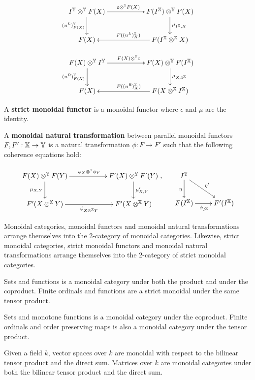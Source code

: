 \begin{definition}
$$
\xymatrix{
 I^\Y \otimes^\Y F(X) \ar[rr]^{\epsilon \otimes^\Y F(X)} \ar[d]_{(u^L)^\Y_{F(X)}}
  &&  F(I^\X) \otimes^\Y F(X) \ar[d]^{\mu_{1^\X,X}}
\\F(X)
 & & F(I^\X\otimes^\X X) \ar[ll]_{F((u^L)^\X_{X} )}
}
$$


$$
\xymatrix{
  F(X)  \otimes^\Y I^\Y \ar[rr]^{ F(X)  \otimes^\Y \epsilon} \ar[d]_{(u^R)^\Y_{F(X)}}
  && F(X) \otimes^\Y    F(I^\X)  \ar[d]^{\mu_{X,1^\X}}
\\F(X)
 & & F(X \otimes^\X I^\X ) \ar[ll]_{F((u^R)^\X_{X} )}
}
$$


A {\bf strict monoidal functor} is a monoidal functor where $\epsilon$ and $\mu$ are the identity.


A {\bf monoidal natural transformation} between parallel monoidal functors $F,F':\mathbb{X}\to \mathbb{Y}$ is a natural transformation $\phi:F\to F'$ such that the following coherence equations hold:

$$
\xymatrix{
  F(X)\otimes^\Y F(Y) \ar[rr]^{\phi_X\otimes^\Y \phi_Y} \ar[d]_{\mu_{X,Y}}
   && F'(X)\otimes^\Y F'(Y) \ar[d]^{\mu'_{X,Y}}
 \\F'(X\otimes^\X Y) \ar[rr]_{\phi_{X\otimes^\X Y}}
   && F'(X\otimes^\X Y)
},
\hspace*{.5cm}
\xymatrix{
I^\Y \ar[dr]^{\eta'} \ar[d]_{\eta}
\\ F(I^\X) \ar[r]_{\phi_{I^\X}}
  &F'(I^\X)
}
$$

Monoidal categories, monoidal functors and monoidal natural transformations arrange themselves into the 2-category of monoidal categories. Likewise, strict monoidal categories, strict monoidal functors and monoidal natural transformations arrange themselves into the 2-category of strict monoidal categories.
\end{definition}

\begin{example}
Sets and functions is a monoidal category under both the product and under the coproduct.
Finite ordinals and functions are a strict monoidal under the same tensor product.

Sets and monotone functions is a monoidal category under the coproduct.
Finite ordinals and order preserving maps is also a monoidal category under the tensor product.


Given a field $k$, vector spaces over $k$ are monoidal with respect to the bilinear tensor product and the direct sum.
Matrices over $k$ are monoidal categories under both the bilinear tensor product and the direct sum.
\end{example}

